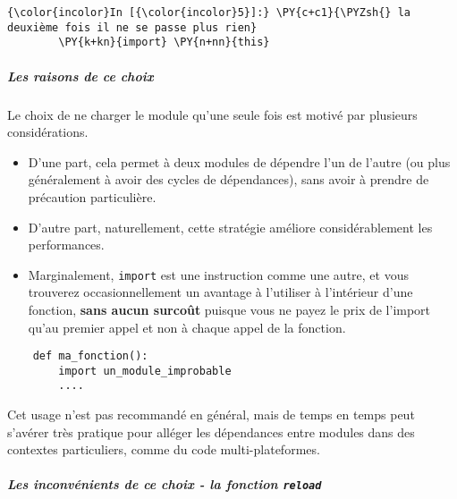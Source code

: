     \begin{Verbatim}[commandchars=\\\{\}]
{\color{incolor}In [{\color{incolor}5}]:} \PY{c+c1}{\PYZsh{} la deuxième fois il ne se passe plus rien}
        \PY{k+kn}{import} \PY{n+nn}{this}
\end{Verbatim}


    \hypertarget{les-raisons-de-ce-choix}{%
\subparagraph{Les raisons de ce choix}\label{les-raisons-de-ce-choix}}

    Le choix de ne charger le module qu'une seule fois est motivé par
plusieurs considérations.

    \begin{itemize}
\tightlist
\item
  D'une part, cela permet à deux modules de dépendre l'un de l'autre (ou
  plus généralement à avoir des cycles de dépendances), sans avoir à
  prendre de précaution particulière.
\end{itemize}

    \begin{itemize}
\tightlist
\item
  D'autre part, naturellement, cette stratégie améliore considérablement
  les performances.
\end{itemize}

    \begin{itemize}
\tightlist
\item
  Marginalement, \texttt{import} est une instruction comme une autre, et
  vous trouverez occasionnellement un avantage à l'utiliser à
  l'intérieur d'une fonction, \textbf{sans aucun surcoût} puisque vous
  ne payez le prix de l'import qu'au premier appel et non à chaque appel
  de la fonction.
\end{itemize}

\begin{verbatim}
    def ma_fonction():
        import un_module_improbable
        ....
\end{verbatim}

Cet usage n'est pas recommandé en général, mais de temps en temps peut
s'avérer très pratique pour alléger les dépendances entre modules dans
des contextes particuliers, comme du code multi-plateformes.

    \hypertarget{les-inconvuxe9nients-de-ce-choix---la-fonction-reload}{%
\subparagraph{\texorpdfstring{Les inconvénients de ce choix - la
fonction
\texttt{reload}}{Les inconvénients de ce choix - la fonction reload}}\label{les-inconvuxe9nients-de-ce-choix---la-fonction-reload}}

